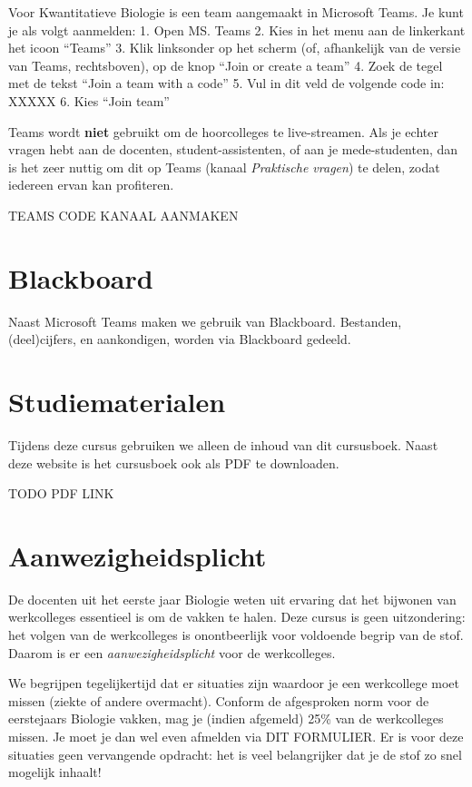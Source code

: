 \documentclass[
  a4paper,
]{scrbook}
\theoremstyle{definition}
\theoremstyle{remark}
\begin{document}
Voor Kwantitatieve Biologie is een team aangemaakt in Microsoft Teams.
Je kunt je als volgt aanmelden: 1. Open MS. Teams 2. Kies in het menu
aan de linkerkant het icoon ``Teams'' 3. Klik linksonder op het scherm
(of, afhankelijk van de versie van Teams, rechtsboven), op de knop
``Join or create a team'' 4. Zoek de tegel met de tekst ``Join a team
with a code'' 5. Vul in dit veld de volgende code in: XXXXX 6. Kies
``Join team''

Teams wordt \textbf{niet} gebruikt om de hoorcolleges te live-streamen.
Als je echter vragen hebt aan de docenten, student-assistenten, of aan
je mede-studenten, dan is het zeer nuttig om dit op Teams (kanaal
\emph{Praktische vragen}) te delen, zodat iedereen ervan kan profiteren.

TEAMS CODE KANAAL AANMAKEN

\section{Blackboard}\label{blackboard}

Naast Microsoft Teams maken we gebruik van Blackboard. Bestanden,
(deel)cijfers, en aankondigen, worden via Blackboard gedeeld.

\section{Studiematerialen}\label{studiematerialen}

Tijdens deze cursus gebruiken we alleen de inhoud van dit cursusboek.
Naast deze website is het cursusboek ook als PDF te downloaden.

TODO PDF LINK

\section{Aanwezigheidsplicht}\label{aanwezigheidsplicht}

De docenten uit het eerste jaar Biologie weten uit ervaring dat het
bijwonen van werkcolleges essentieel is om de vakken te halen. Deze
cursus is geen uitzondering: het volgen van de werkcolleges is
onontbeerlijk voor voldoende begrip van de stof. Daarom is er een
\emph{aanwezigheidsplicht} voor de werkcolleges.

We begrijpen tegelijkertijd dat er situaties zijn waardoor je een
werkcollege moet missen (ziekte of andere overmacht). Conform de
afgesproken norm voor de eerstejaars Biologie vakken, mag je (indien
afgemeld) 25\% van de werkcolleges missen. Je moet je dan wel even
afmelden via DIT FORMULIER. Er is voor deze situaties geen vervangende
opdracht: het is veel belangrijker dat je de stof zo snel mogelijk
inhaalt!
\end{document}
